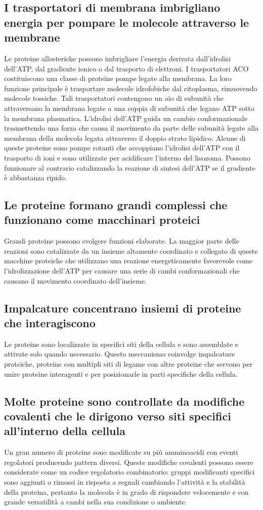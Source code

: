 \subsection{I trasportatori di membrana imbrigliano energia per pompare le molecole attraverso le membrane}
Le proteine allosteriche possono imbrigliare l'energia derivata dall'idrolisi dell'ATP, dal gradiente ionico o dal trasporto di elettroni. I trasportatori ACO costituiscono una classe
di proteine pompe legate alla membrana. La loro funzione principale \`e trasportare molecole idrofobiche dal citoplasma, rimuovendo molecole tossiche. Tali trasportatori contengono un
aio di subunit\`a che attraversano la membrana legate a una coppia di subunit\`a che legano ATP sotto la membrana plasmatica. L'idrolisi dell'ATP guida un cambio conformazionale
trasmettendo una forza che causa il movimento da parte delle subunit\`a legate alla membrana della molecola legata attraverso il doppio strato lipidico. Alcune di queste proteine 
sono pompe rotanti che accoppiano l'idrolisi dell'ATP con il trasporto di ioni  e sono utilizzate per acidificare l'interno del lisozoma. Possono funzionare al contrario 
catalizzando la reazione di sintesi dell'ATP se il gradiente \`e abbastanza ripido. 
\subsection{Le proteine formano grandi complessi che funzionano come macchinari proteici}
Grandi proteine possono svolgere funzioni elaborate. La maggior parte delle reazioni sono catalizzate da un insieme altamente coordinato e collegato di queste macchine proteiche che
utilizzano una reazione energeticamente favorevole come l'idrolizzazione dell'ATP per causare una serie di cambi conformazionali che causano il movimento coordinato dell'insieme. 
\subsection{Impalcature concentrano insiemi di proteine che interagiscono}
Le proteine sono localizzate in specifici siti della cellula e sono assemblate e attivate solo quando necessario. Questo meccanismo coinvolge impalcature proteiche, proteine con 
multipli siti di legame con altre proteine che servono per unire proteine interagenti e per posizionarle in parti specifiche della cellula. 
\subsection{Molte proteine sono controllate da modifiche covalenti che le dirigono verso siti specifici all'interno della cellula}
Un gran numero di proteine sono modificate su pi\`u amminoacidi con eventi regolatori producendo pattern diversi. Queste modifiche covalenti possono essere considerate come un codice
regolatorio combinatorio: gruppi modificanti specifici sono aggiunti o rimossi in risposta a segnali cambiando l'attivit\`a e la stabilit\`a della proteina, pertanto la molecola \`e in
grado di rispondere velocemente e con grande versatilit\`a a cambi nella sua condizione o ambiente.
